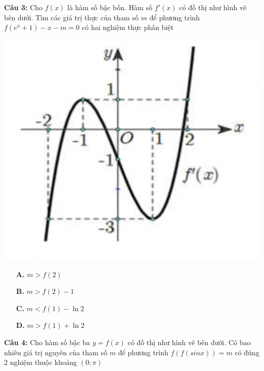 \documentclass[12pt, a4paper]{article}
\begin{document}
\vspace{-0.6cm}			
			
		\textbf{Câu 3: } Cho $f(x)$ là hàm số bậc bốn. Hàm số $f'(x)$ có đồ thị như hình vẽ bên dưới. Tìm các giá trị thực của tham số $m$ để phương trình $f(e^x+1)-x-m=0$ có hai nghiệm thực phân biệt
		
\vspace{-0.6cm}	
		
			\begin{center}
				\includegraphics[scale=0.6]{../images/tuonggiao_cau3.png}
			\end{center}
			
\vspace{-0.6cm}			
			
			\begin{multicols}{4}
				\begin{enumerate}
					\item[\textbf{A.}] $m>f(2)$
					\item[\textbf{B.}] $m>f(2)-1$
					\item[\textbf{C.}] $m<f(1)-\ln 2$
					\item[\textbf{D.}] $m>f(1) + \ln 2$
				\end{enumerate}
			\end{multicols}
			
		\textbf{Câu 4: } Cho hàm số bậc ba $y=f(x)$ có đồ thị như hình vẽ bên dưới. Có bao nhiêu giá trị nguyên của tham số $m$ để phương trình $f(f(sinx))=m$ có đúng 2 nghiệm thuộc khoảng $(0;\pi)$
		
\end{document}
